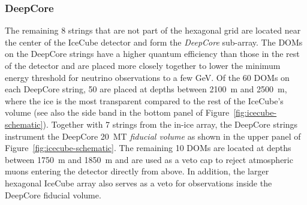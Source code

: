 \subsubsection{DeepCore}
The remaining 8 strings that are not part of the hexagonal grid are located near the center of the IceCube detector and form the \emph{DeepCore} sub-array.
The DOMs on the DeepCore strings have a higher quantum efficiency than those in the rest of the detector and are placed more closely together to lower the minimum energy threshold for neutrino observations to a few GeV.
Of the 60 DOMs on each DeepCore string, 50 are placed at depths between 2100~m and 2500~m, where the ice is the most transparent compared to the rest of the IceCube's volume (see also the side band in the bottom panel of Figure~\ref{fig:icecube-schematic}).
Together with 7 strings from the in-ice array, the DeepCore strings instrument the DeepCore 20~MT \emph{fiducial volume} as shown in the upper panel of Figure~\ref{fig:icecube-schematic}.
The remaining 10 DOMs are located at depths between 1750~m and 1850~m and are used as a veto cap to reject atmospheric muons entering the detector directly from above.
In addition, the larger hexagonal IceCube array also serves as a veto for observations inside the DeepCore fiducial volume.
